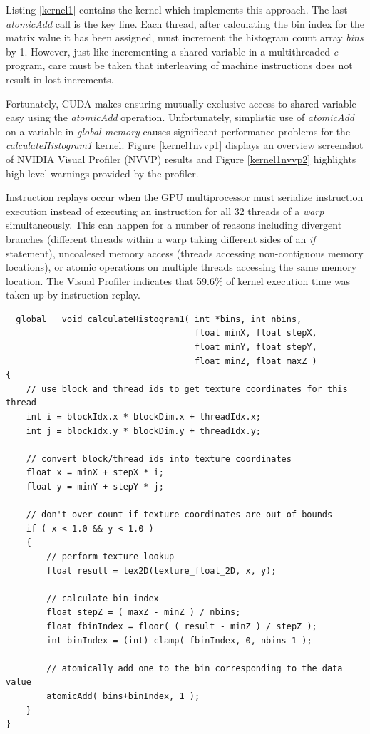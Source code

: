 \documentclass{article}
\begin{document}
Listing \ref{kernel1} contains the kernel which implements this approach. The last \emph{atomicAdd} call is the key line. Each thread, after calculating the bin index for the matrix value it has been assigned, must increment the histogram count array \emph{bins} by 1. However, just like incrementing a shared variable in a multithreaded \emph{c} program, care must be taken that interleaving of machine instructions does not result in lost increments.

Fortunately, CUDA makes ensuring mutually exclusive access to shared variable easy using the \emph{atomicAdd} operation\cite{arithmetic-functions}. Unfortunately, simplistic use of \emph{atomicAdd} on a variable in \emph{global memory} causes significant performance problems for the \emph{calculateHistogram1} kernel. Figure \ref{kernel1nvvp1} displays an overview screenshot of NVIDIA Visual Profiler (NVVP) results and Figure \ref{kernel1nvvp2} highlights high-level warnings provided by the profiler.

Instruction replays occur when the GPU multiprocessor must serialize instruction execution instead of executing an instruction for all 32 threads of a \emph{warp} simultaneously. This can happen for a number of reasons including divergent branches (different threads within a warp taking different sides of an \emph{if} statement), uncoalesed memory access (threads accessing non-contiguous memory locations), or atomic operations on multiple threads accessing the same memory location. The Visual Profiler indicates that 59.6\% of kernel execution time was taken up by instruction replay.

\lstset{language=C,basicstyle=\footnotesize}
\begin{minipage}{\textwidth}
\begin{lstlisting}[caption={Global Memory atomicAdd kernel},label={kernel1}]
__global__ void calculateHistogram1( int *bins, int nbins,
                                     float minX, float stepX,
                                     float minY, float stepY,
                                     float minZ, float maxZ )
{
    // use block and thread ids to get texture coordinates for this thread
    int i = blockIdx.x * blockDim.x + threadIdx.x;
    int j = blockIdx.y * blockDim.y + threadIdx.y;

    // convert block/thread ids into texture coordinates
    float x = minX + stepX * i;
    float y = minY + stepY * j;

    // don't over count if texture coordinates are out of bounds
    if ( x < 1.0 && y < 1.0 )
    {
        // perform texture lookup
        float result = tex2D(texture_float_2D, x, y);
    
        // calculate bin index
        float stepZ = ( maxZ - minZ ) / nbins;
        float fbinIndex = floor( ( result - minZ ) / stepZ );
        int binIndex = (int) clamp( fbinIndex, 0, nbins-1 );
    
        // atomically add one to the bin corresponding to the data value
        atomicAdd( bins+binIndex, 1 );
    }
}
\end{lstlisting}
\end{minipage}
\end{document}
